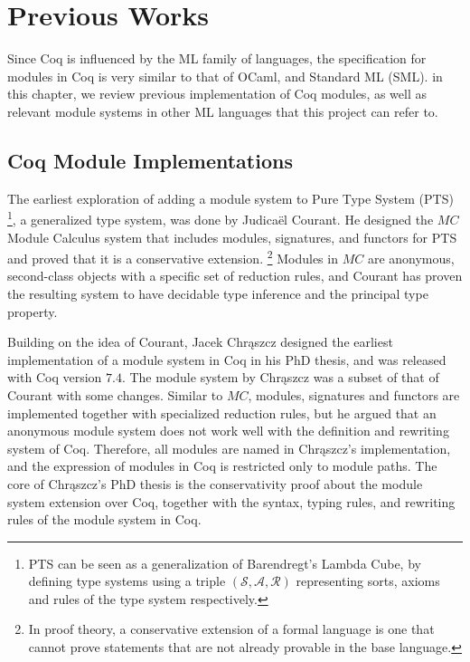 \chapter{Previous Works}

Since Coq is influenced by the ML family of languages, the specification for
modules in Coq is very similar to that of OCaml, and Standard ML (SML). in this
chapter, we review previous implementation of Coq modules, as well as relevant
module systems in other ML languages that this project can refer to.



\section{Coq Module Implementations}
The earliest exploration of adding a module system to Pure Type System (PTS)
\footnote{PTS can be seen as a generalization of Barendregt's Lambda Cube,
by defining type systems using a triple $(\mathscr{S},\mathscr{A},\mathscr{R})$
representing sorts, axioms and rules of the type system respectively.},
a generalized type system, was done by Judicaël Courant. He designed the $MC$
Module Calculus system that includes modules, signatures, and functors for PTS
and proved that it is a conservative extension.
\footnote{In proof theory, a conservative extension of a formal language is one
that cannot prove statements that are not already provable in the base language.}
 Modules in $MC$ are 
anonymous, second-class objects with a specific set of reduction rules, and
Courant has proven the resulting system to have decidable type inference and 
the principal type property.

Building on the idea of Courant, Jacek Chrąszcz designed the earliest
implementation of a module system in Coq in his PhD thesis, and was released
with Coq version $7.4$. The module system by Chrąszcz was a subset of that of
Courant with some changes. Similar to $MC$, modules, signatures and functors are
implemented together with specialized reduction rules, but he argued that an
anonymous module system does not work well with the definition and rewriting
system of Coq. Therefore, all modules are named in Chrąszcz's implementation,
and the expression of modules in Coq is restricted only to module paths. The
core of Chrąszcz's PhD thesis is the conservativity proof about the module
system extension over Coq, together with the syntax, typing rules, and rewriting
rules of the module system in Coq.

